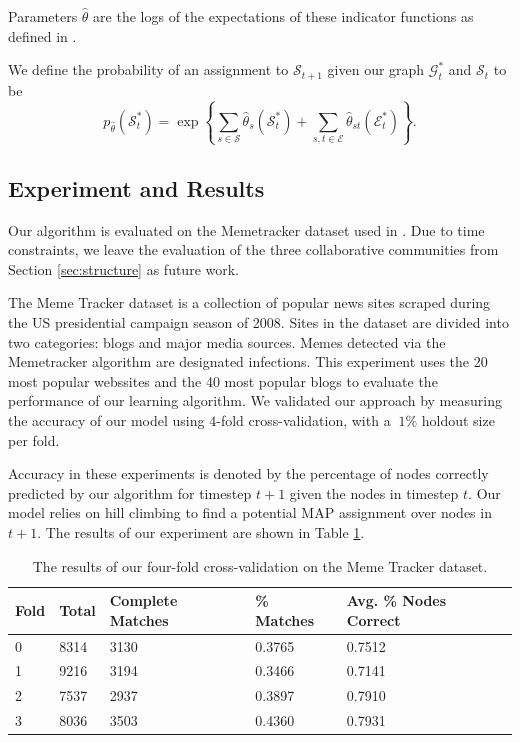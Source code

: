 \documentclass{article} %
\begin{document}
Parameters $\hat{\theta}$ are the logs of the expectations of these indicator functions as defined in \cite{wainwright}.

We define the probability of an assignment to $\mathcal{S}_{t+1}$ given our graph $\mathcal{G}^*_t$ and $\mathcal{S}_t$  to be
  $$p_{\hat{\theta}}(\mathcal{S}_t^*)
  =\exp \left\{ \sum_{s\in \mathcal{S}}\hat{\theta}_s(\mathcal{S}_t^*)+\sum_{s,t\in \mathcal{E}}\hat{\theta}_{st}(\mathcal{E}_t^*)\right\} .$$


\subsection{Experiment and Results}

Our algorithm is evaluated on the Memetracker dataset used in \cite{memetracker}. Due to time constraints, we leave the evaluation of the three collaborative communities from Section \ref{sec:structure} as future work.

The Meme Tracker dataset is a collection of popular news sites scraped during the US presidential campaign season of 2008. Sites in the dataset are divided into two categories: blogs and major media sources. Memes detected via the Memetracker algorithm \cite{memetracker} are designated infections. This experiment uses the 20 most popular webssites and the 40 most popular blogs to evaluate the performance of our learning algorithm. We validated our approach by measuring the accuracy of our model using $4$-fold cross-validation, with a $~1\%$ holdout size per fold.

Accuracy in these experiments is denoted by the percentage of nodes correctly predicted by our algorithm for timestep $t+1$ given the nodes in timestep $t$. Our model relies on hill climbing to find a potential MAP assignment over nodes in $t+1$. The results of our experiment are shown in Table \ref{tab:results}.

\begin{table}
\centering
\begin{tabular}{|l|l|l|l|l|}
\hline
Fold & Total & Complete Matches & \% Matches & Avg. \% Nodes Correct   \\ \hline
0 & 8314 & 3130 & 0.3765 & 0.7512  \\ \hline
1 & 9216 & 3194 & 0.3466 & 0.7141  \\ \hline
2 & 7537 & 2937 & 0.3897 & 0.7910  \\ \hline
3 & 8036 & 3503 & 0.4360 & 0.7931 \\ \hline   
\end{tabular}
\caption{The results of our four-fold cross-validation on the Meme Tracker dataset.}
\label{tab:results}
\end{table}
\end{document}
